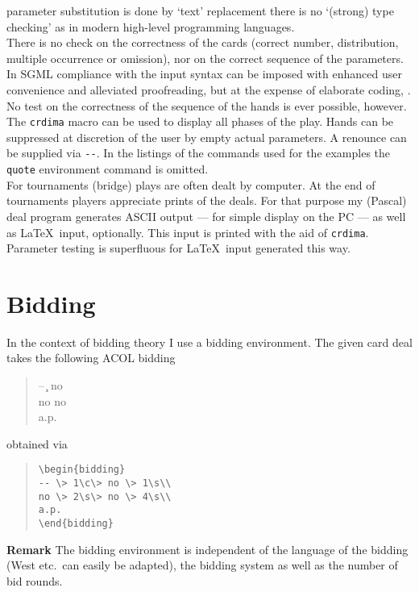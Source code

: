 parameter substitution is done by `text'
replacement there is no `(strong) type checking'
as in modern high-level programming languages. \\
There is no check on the correctness of the cards (correct number,
distribution, multiple occurrence or omission), nor on the correct sequence
of the parameters. In SGML compliance with the input syntax can be
imposed with enhanced user convenience and alleviated proofreading, but
at the expense of elaborate coding, \cite{JG}.
No test on the
correctness of the sequence of the hands is ever possible, however.\\
The \verb=crdima= macro can be used
to display all phases of the play.
Hands can be suppressed at discretion of the user
by empty actual parameters.
A renounce can be supplied via \verb=--=.
In the listings of the commands used for the examples
the \verb=quote= environment command is omitted.
\\[1ex]
For tournaments (bridge) plays are often dealt by computer.
At the end of tournaments players appreciate prints
of the deals. For that purpose my (Pascal) deal program
generates ASCII output --- for simple display on the PC ---
as well as \LaTeX\ input, optionally. This input is printed
with the aid of \verb=crdima=. Parameter testing is superfluous
for \LaTeX\ input generated this way.
%
\section{Bidding}
In the context of bidding theory I use a bidding environment.
The given card deal takes the following ACOL bidding
\begin{quote}
\begin{bidding}
-- \c\> no \s\\
no \s\> no \s\\
a.p.
\end{bidding}
\end{quote}
obtained via
\begin{quote}
\begin{verbatim}
\begin{bidding}
-- \> 1\c\> no \> 1\s\\
no \> 2\s\> no \> 4\s\\
a.p.
\end{bidding}
\end{verbatim}
\end{quote}
{\bf Remark} The bidding environment is independent of the language
of the bidding (West etc.\ can easily be adapted),
the bidding system as well as the number of bid
rounds.
